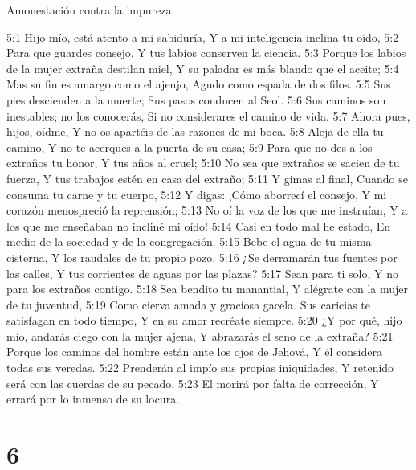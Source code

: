 Amonestación contra la impureza  

5:1 Hijo mío, está atento a mi sabiduría,  
Y a mi inteligencia inclina tu oído,  
5:2 Para que guardes consejo,  
Y tus labios conserven la ciencia.  
5:3 Porque los labios de la mujer extraña destilan miel,  
Y su paladar es más blando que el aceite;  
5:4 Mas su fin es amargo como el ajenjo,  
Agudo como espada de dos filos.  
5:5 Sus pies descienden a la muerte;  
Sus pasos conducen al Seol.  
5:6 Sus caminos son inestables; no los conocerás,  
Si no considerares el camino de vida.  
5:7 Ahora pues, hijos, oídme,  
Y no os apartéis de las razones de mi boca.  
5:8 Aleja de ella tu camino,  
Y no te acerques a la puerta de su casa;  
5:9 Para que no des a los extraños tu honor,  
Y tus años al cruel;  
5:10 No sea que extraños se sacien de tu fuerza,  
Y tus trabajos estén en casa del extraño;  
5:11 Y gimas al final,  
Cuando se consuma tu carne y tu cuerpo,  
5:12 Y digas: ¡Cómo aborrecí el consejo,  
Y mi corazón menospreció la reprensión;  
5:13 No oí la voz de los que me instruían,  
Y a los que me enseñaban no incliné mi oído!  
5:14 Casi en todo mal he estado,  
En medio de la sociedad y de la congregación.  
5:15 Bebe el agua de tu misma cisterna,  
Y los raudales de tu propio pozo.  
5:16 ¿Se derramarán tus fuentes por las calles,  
Y tus corrientes de aguas por las plazas?  
5:17 Sean para ti solo,  
Y no para los extraños contigo.  
5:18 Sea bendito tu manantial,  
Y alégrate con la mujer de tu juventud,  
5:19 Como cierva amada y graciosa gacela.  
Sus caricias te satisfagan en todo tiempo,  
Y en su amor recréate siempre.  
5:20 ¿Y por qué, hijo mío, andarás ciego con la mujer ajena,  
Y abrazarás el seno de la extraña?  
5:21 Porque los caminos del hombre están ante los ojos de Jehová,  
Y él considera todas sus veredas.  
5:22 Prenderán al impío sus propias iniquidades,  
Y retenido será con las cuerdas de su pecado.  
5:23 El morirá por falta de corrección,  
Y errará por lo inmenso de su locura.  

\chapter{6}

